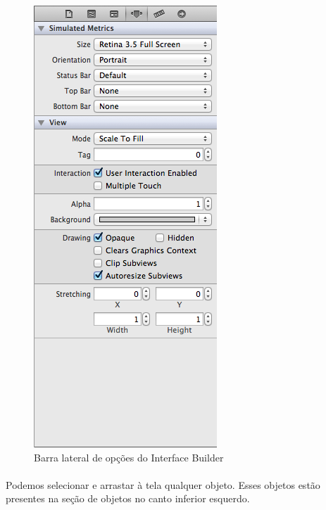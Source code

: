 \documentclass[a4paper,12pt,brazil,doubleside]{book}
\begin{document}
\begin{figure}[h]
  \centering
  \includegraphics[totalheight=0.35\textheight]{../figuras/ios/1/xib_opcoes.png}
  \caption{Barra lateral de opções do Interface Builder}
  \label{fig:a}
\end{figure}

\bigskip

\paragraph{}Podemos selecionar e arrastar à tela qualquer objeto. Esses objetos estão presentes na seção de objetos no canto inferior esquerdo.
\end{document}
